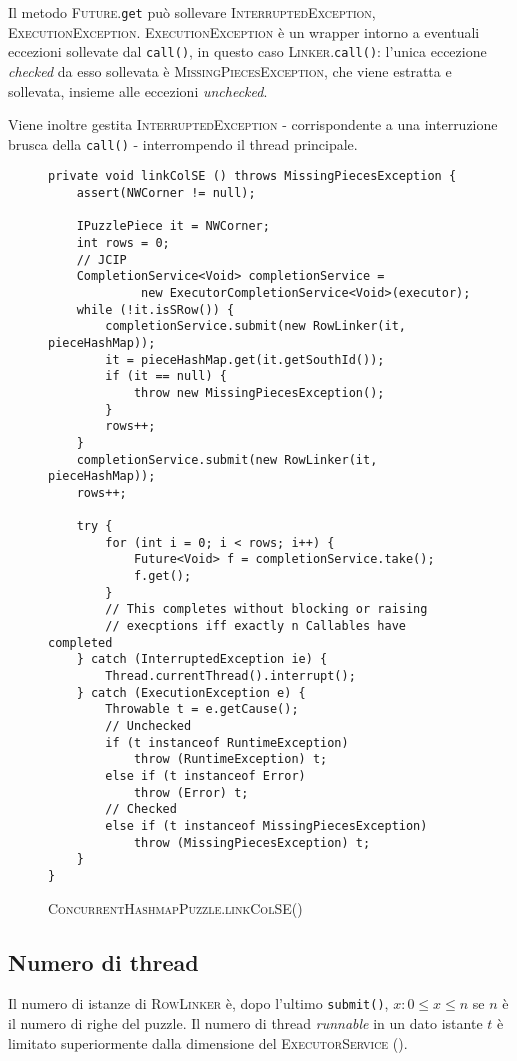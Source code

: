 \documentclass[a4paper]{article}
\newcommand{\Classname}[1]{\textsc{#1}}
\newcommand{\Methodname}[1]{\texttt{#1}}
\begin{document}
Il metodo \Classname{Future}.\Methodname{get} pu\`o sollevare \Classname{InterruptedException}, \Classname{ExecutionException}.
\Classname{ExecutionException} \`e un wrapper intorno a eventuali eccezioni sollevate dal \Methodname{call()}, in questo caso \Classname{Linker}.\Methodname{call()}: l'unica eccezione \emph{checked} da esso sollevata \`e \Classname{MissingPiecesException}, che viene estratta e sollevata, insieme alle eccezioni \emph{unchecked}.

Viene inoltre gestita \Classname{InterruptedException} - corrispondente a una interruzione brusca della \Methodname{call()} - interrompendo il thread principale.

\begin{figure}[h!]
  \centering
\label{linkcol}
\begin{lstlisting}[frame=single]
private void linkColSE () throws MissingPiecesException {
	assert(NWCorner != null);
	
	IPuzzlePiece it = NWCorner;
	int rows = 0;
	// JCIP
	CompletionService<Void> completionService = 
             new ExecutorCompletionService<Void>(executor);
	while (!it.isSRow()) {
		completionService.submit(new RowLinker(it, pieceHashMap));
		it = pieceHashMap.get(it.getSouthId());
		if (it == null) {
			throw new MissingPiecesException();
		}
		rows++;
	}
	completionService.submit(new RowLinker(it, pieceHashMap));
	rows++;

	try {
		for (int i = 0; i < rows; i++) {
			Future<Void> f = completionService.take();
			f.get();
		}
		// This completes without blocking or raising
		// execptions iff exactly n Callables have completed
	} catch (InterruptedException ie) {
		Thread.currentThread().interrupt();
	} catch (ExecutionException e) {
		Throwable t = e.getCause();
		// Unchecked
		if (t instanceof RuntimeException) 
			throw (RuntimeException) t;
		else if (t instanceof Error)
			throw (Error) t;
		// Checked
		else if (t instanceof MissingPiecesException)
			throw (MissingPiecesException) t;
	}
}
\end{lstlisting}
\caption {\textsc{ConcurrentHashmapPuzzle.linkColSE()}}
\end{figure}

\subsection{Numero di thread}
Il numero di istanze di \Classname{RowLinker} \`e, dopo l'ultimo \Methodname{submit()}, $x : 0 \leq x \leq n$ se $n$ \`e il numero di righe del puzzle.
Il numero di thread \emph{runnable} in un dato istante $t$ \`e limitato superiormente dalla dimensione del \Classname{ExecutorService} (\cite{goetz2006java}).
\end{document}
